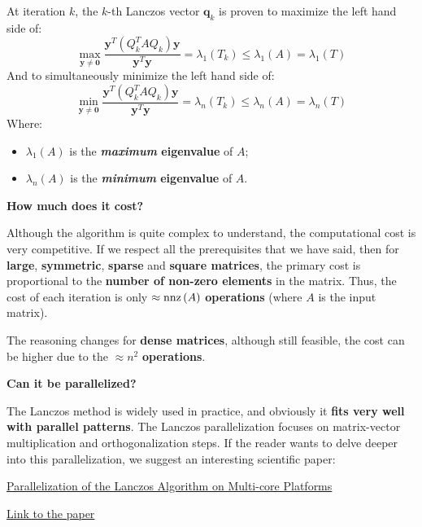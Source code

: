 At iteration $k$, the $k$-th Lanczos vector $\mathbf{q}_{k}$ is proven to maximize the left hand side of:
\begin{equation*}
    \underset{\mathbf{y} \ne \mathbf{0}}{\max} \dfrac{
        \mathbf{y}^{T} \left(Q_{k}^{T}A Q_{k}\right) \mathbf{y}
    }{
        \mathbf{y}^{T} \mathbf{y}
    }
    =
    \lambda_{1}\left(T_{k}\right) \le \lambda_{1}\left(A\right) = \lambda_{1}\left(T\right)
\end{equation*}
And to simultaneously minimize the left hand side of:
\begin{equation*}
    \underset{\mathbf{y} \ne \mathbf{0}}{\min} \dfrac{
        \mathbf{y}^{T} \left(Q_{k}^{T}A Q_{k}\right) \mathbf{y}
    }{
        \mathbf{y}^{T} \mathbf{y}
    }
    =
    \lambda_{n}\left(T_{k}\right) \le \lambda_{n}\left(A\right) = \lambda_{n}\left(T\right)
\end{equation*}
Where:
\begin{itemize}
    \item $\lambda_{1}\left(A\right)$ is the \textbf{\emph{maximum} eigenvalue} of $A$;
    \item $\lambda_{n}\left(A\right)$ is the \textbf{\emph{minimum} eigenvalue} of $A$.
\end{itemize}

\newpage

\begin{flushleft}
    \textcolor{Red2}{ \textbf{How much does it cost?}}
\end{flushleft}
Although the algorithm is quite complex to understand, the computational cost is very competitive. If we respect all the prerequisites that we have said, then for \textbf{large}, \textbf{symmetric}, \textbf{sparse} and \textbf{square matrices}, the primary cost is proportional to the \textbf{number of non-zero elements} in the matrix. Thus, the cost of each iteration is only $\approx \mathrm{nnz}\left(A\right)$ \textbf{operations} (where $A$ is the input matrix).

\highspace
The reasoning changes for \textbf{dense matrices}, although still feasible, the cost can be higher due to the $\approx n^{2}$ \textbf{operations}.

\highspace
\begin{flushleft}
    \textcolor{Green3}{ \textbf{Can it be parallelized?}}
\end{flushleft}
The Lanczos method is widely used in practice, and obviously it \textbf{fits very well with parallel patterns}. The Lanczos parallelization focuses on matrix-vector multiplication and orthogonalization steps. If the reader wants to delve deeper into this parallelization, we suggest an interesting scientific paper:
\begin{center}
    \href{https://link.springer.com/chapter/10.1007/978-3-642-11322-2_25}{Parallelization of the Lanczos Algorithm on Multi-core Platforms} 

    \highspace
    \href{https://cse.iitkgp.ac.in/~abhij/publications/ParLanczos10.pdf}{Link to the paper} \hspace{2em} 
\end{center}